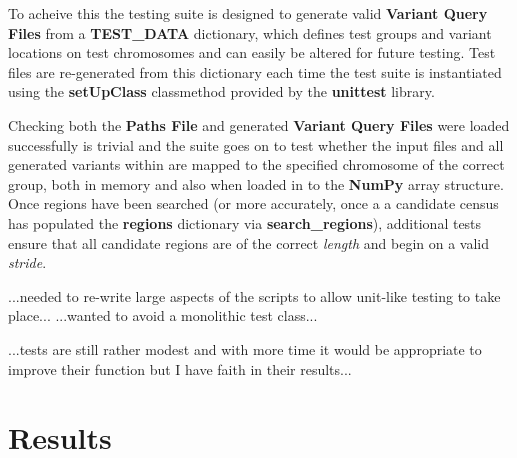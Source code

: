 To acheive this the testing suite is designed to generate valid
\textbf{Variant Query Files} from a \textbf{TEST\_DATA} dictionary, which
defines test groups and variant locations on test chromosomes and can easily be
altered for future testing. Test files are re-generated from this dictionary
each time the test suite is instantiated using the \textbf{setUpClass}
classmethod provided by the \textbf{unittest} library.

Checking both the \textbf{Paths File} and generated \textbf{Variant Query Files}
were loaded successfully is trivial and the suite goes on to test whether the
input files and all generated variants within are mapped to the specified
chromosome of the correct group, both in memory and also when loaded in to the
\textbf{NumPy} array structure. Once regions have been searched (or more
accurately, once a a candidate census has populated the \textbf{regions}
dictionary via \textbf{search\_regions}), additional tests ensure that all
candidate regions are of the correct \textit{length} and begin on a valid
\textit{stride}.


...needed to re-write large aspects of the scripts to allow unit-like testing to
take place... ...wanted to avoid a monolithic test class...

...tests are still rather modest and with more time it would be appropriate to
improve their function but I have faith in their results...


\chapter{Results}


